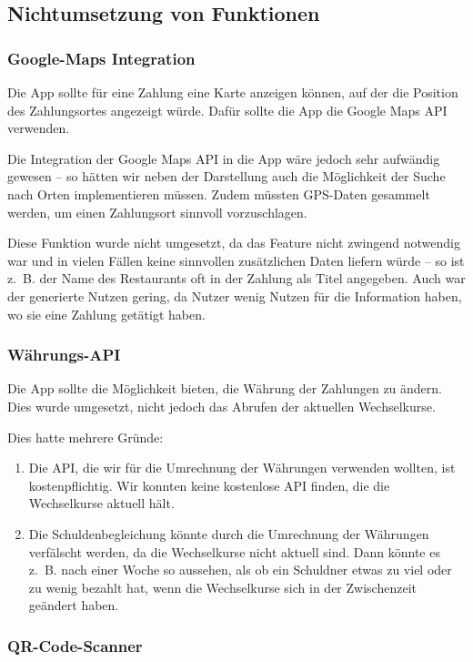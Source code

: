 \subsection{Nichtumsetzung von Funktionen}

\subsubsection{Google-Maps Integration}

Die App sollte für eine Zahlung eine Karte anzeigen können, auf der die Position des Zahlungsortes angezeigt würde.
Dafür sollte die App die Google Maps API verwenden.

Die Integration der Google Maps API in die App wäre jedoch sehr aufwändig gewesen -- so hätten wir neben der Darstellung auch die Möglichkeit der Suche nach Orten implementieren müssen.
Zudem müssten GPS-Daten gesammelt werden, um einen Zahlungsort sinnvoll vorzuschlagen.

Diese Funktion wurde nicht umgesetzt, da das Feature nicht zwingend notwendig war und in vielen Fällen keine sinnvollen zusätzlichen Daten liefern würde -- so ist z. B. der Name des Restaurants oft in der Zahlung als Titel angegeben.
Auch war der generierte Nutzen gering, da Nutzer wenig Nutzen für die Information haben, wo sie eine Zahlung getätigt haben.

\subsubsection{Währungs-API}

Die App sollte die Möglichkeit bieten, die Währung der Zahlungen zu ändern.
Dies wurde umgesetzt, nicht jedoch das Abrufen der aktuellen Wechselkurse.

Dies hatte mehrere Gründe:
\begin{enumerate}
    \item Die API, die wir für die Umrechnung der Währungen verwenden wollten, ist kostenpflichtig. Wir konnten keine kostenlose API finden, die die Wechselkurse aktuell hält.
    \item Die Schuldenbegleichung könnte durch die Umrechnung der Währungen verfälscht werden, da die Wechselkurse nicht aktuell sind. Dann könnte es z. B. nach einer Woche so aussehen, als ob ein Schuldner etwas zu viel oder zu wenig bezahlt hat, wenn die Wechselkurse sich in der Zwischenzeit geändert haben.
\end{enumerate}

\subsubsection{QR-Code-Scanner}

